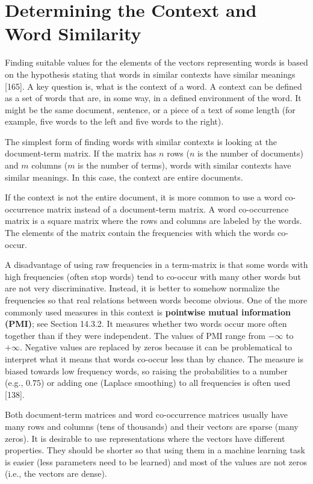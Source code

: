 \documentclass[11pt,openany,executivepaper]{book}
\begin{document}
\section{Determining the Context and Word Similarity}
Finding suitable values for the elements of the vectors representing words is based on the hypothesis stating that words in similar contexts have similar meanings [165]. A key question is, what is the context of a word. A context can be defined as a set of words that are, in some way, in a defined environment of the word. It might be the same document, sentence, or a piece of a text of some length (for example, five words to the left and five words to the right).

The simplest form of finding words with similar contexts is looking at the document-term matrix. If the matrix has $n$ rows ($n$ is the number of documents) and $m$ columns ($m$ is the number of terms), words with similar contexts have similar meanings. In this case, the context are entire documents.

If the context is not the entire document, it is more common to use a word co-occurrence matrix instead of a document-term matrix. A word co-occurrence matrix is a square matrix where the rows and columns are labeled by the words. The elements of the matrix contain the frequencies with which the words co-occur.

A disadvantage of using raw frequencies in a term-matrix is that some words with high frequencies (often stop words) tend to co-occur with many other words but are not very discriminative. Instead, it is better to somehow normalize the frequencies so that real relations between words become obvious. One of the more commonly used measures in this context is \textbf{pointwise mutual information (PMI)}; see Section 14.3.2. It measures whether two words occur more often together than if they were independent. The values of PMI range from $-\infty$ to $+\infty$. Negative values are replaced by zeros because it can be problematical to interpret what it means that words co-occur less than by chance. The measure is biased towards low frequency words, so raising the probabilities to a number (e.g., $0.75$) or adding one (Laplace smoothing) to all frequencies is often used [138].

Both document-term matrices and word co-occurrence matrices usually have many rows and columns (tens of thousands) and their vectors are sparse (many zeros). It is desirable to use representations where the vectors have different properties. They should be shorter so that using them in a machine learning task is easier (less parameters need to be learned) and most of the values are not zeros (i.e., the vectors are dense).
\end{document}

